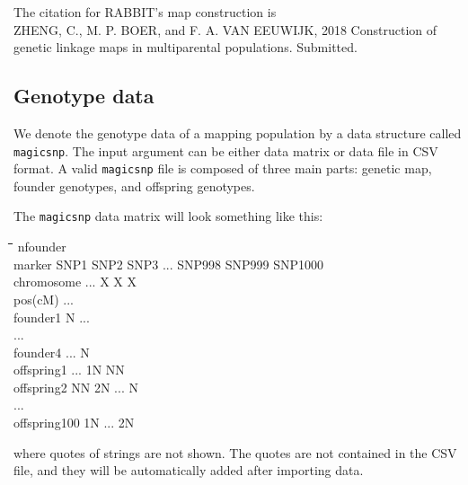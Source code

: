 \documentclass[12pt]{article}
\begin{document}
\vspace{12pt}
The citation for RABBIT's map construction is \\
ZHENG, C., M. P. BOER, and F. A. VAN EEUWIJK, 2018 Construction of genetic linkage maps in multiparental populations. Submitted.

\subsection{Genotype data}

We denote the genotype data of a mapping population by a data structure called \verb|magicsnp|. The input argument can be either data matrix or data file in CSV format. A valid \verb|magicsnp| file is composed of three main parts: genetic map, founder genotypes, and offspring genotypes. 

\newpage

The \verb|magicsnp| data matrix will look something like this: 

\begin{tabbing}
\hspace{3cm}\=\hspace{1.5cm}\=\hspace{1.5cm}\=\hspace{1.5cm}\=\hspace{2cm}\=\hspace{2cm}\=\hspace{2cm}\=\kill
nfounder  \\
marker     \> SNP1  \> SNP2  \>SNP3  \> ... \>  SNP998 \>  SNP999 \> SNP1000 \\
chromosome                \> ... \>  X      \>  X      \> X   \\
pos(cM)           \> ...        \\
founder1       \> N           \> ...                 \\
...        \\
founder4                  \> ...              \> N   \\
offspring1              \> ...  \> 1N  \> NN     \\
offspring2      \> NN    \>2N    \> ...      \> N   \\
...        \\
offspring100 \>1N          \> ...      \> 2N   
\end{tabbing} 
\noindent
where quotes of strings are not shown. The quotes are not contained in the CSV file, and they will be automatically added after importing data. 
\end{document}

